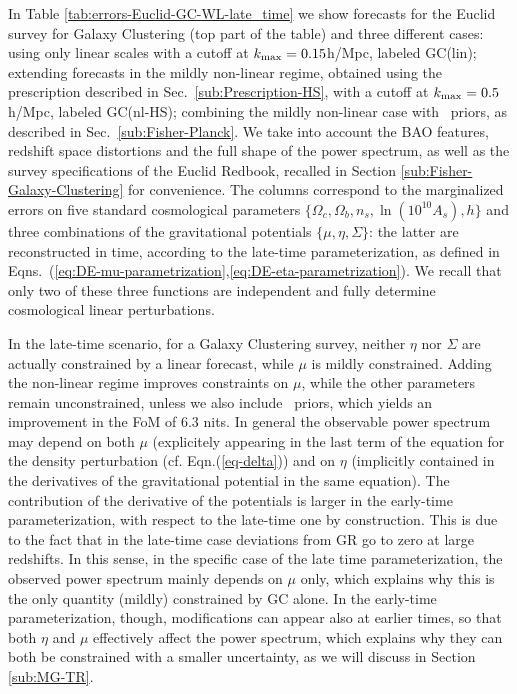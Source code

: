 In Table \ref{tab:errors-Euclid-GC-WL-late_time} we show forecasts for the Euclid survey \cite{laureijs_euclid_2011} for Galaxy Clustering (top part of the table) and three different cases: using only linear scales with a cutoff at $k_{\rm max}=0.15$h/Mpc, labeled GC(lin); extending forecasts in the mildly non-linear regime, obtained using the prescription described in Sec.\ \ref{sub:Prescription-HS}, with a cutoff at $k_{\rm max}=0.5$ h/Mpc, labeled GC(nl-HS); combining the mildly non-linear case with \planck\ priors, as described in Sec.\ \ref{sub:Fisher-Planck}. We take into account
the BAO features, redshift space distortions and the full shape of
the power spectrum, as well as the survey specifications of the Euclid Redbook, recalled
in Section \ref{sub:Fisher-Galaxy-Clustering} for convenience. The columns correspond to the marginalized errors on five standard cosmological parameters $\{\Omega_c, \Omega_b, n_s, \ln (10^{10} A_s), h\}$ and three combinations of the gravitational potentials $\{\mu, \eta, \Sigma\}$: the latter are reconstructed in time, according to the late-time parameterization, as defined in Eqns.\ (\ref{eq:DE-mu-parametrization},\ref{eq:DE-eta-parametrization}). We recall that only two of these three functions are independent and fully determine cosmological linear perturbations.

In the late-time scenario, for a Galaxy Clustering survey,  
neither $\eta$ nor $\Sigma$ are actually
constrained by a linear forecast, while $\mu$ is mildly constrained.  
Adding the non-linear regime improves constraints on $\mu$, while the other parameters remain unconstrained, 
unless we also include \planck\ priors, which yields an improvement in the FoM of 6.3 nits. In general the observable power spectrum may depend on both $\mu$ (explicitely appearing in the last term of the equation for the density perturbation (cf. Eqn.(\ref{eq-delta})) and on $\eta$ (implicitly contained in the derivatives of the gravitational potential in the same equation). The contribution of the derivative of the potentials is larger in the early-time parameterization, with respect to the late-time one by construction. This is due to the fact that in the late-time case deviations from GR go to zero at large redshifts. In this sense, in the specific case of the late time parameterization, the observed power spectrum mainly depends on $\mu$ only, which explains why this is the only quantity (mildly) constrained by GC alone. In the early-time parameterization, though, modifications can appear also at earlier times, so that both $\eta$ and $\mu$ effectively affect the power spectrum, which explains why they can both be constrained with a smaller uncertainty, as we will discuss in Section \ref{sub:MG-TR}.

